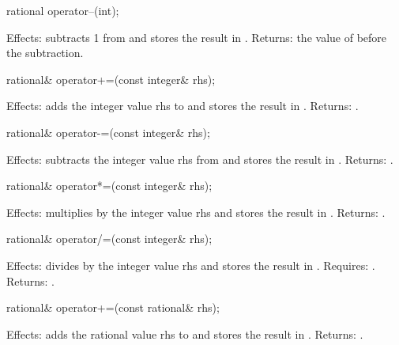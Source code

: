 \begin{itemdecl}
rational operator--(int);
\end{itemdecl}

\begin{itemdescr}
Effects: subtracts 1 from  and stores the result in .
Returns: the value of  before the subtraction.
\end{itemdescr}

\begin{itemdecl}
rational& operator+=(const integer& rhs);
\end{itemdecl}

\begin{itemdescr}
Effects: adds the integer value rhs to  and stores the result in .
Returns: .
\end{itemdescr}

\begin{itemdecl}
rational& operator-=(const integer& rhs);
\end{itemdecl}

\begin{itemdescr}
Effects: subtracts the integer value rhs from  and stores the result in .
Returns: .
\end{itemdescr}

\begin{itemdecl}
rational& operator*=(const integer& rhs);
\end{itemdecl}

\begin{itemdescr}
Effects: multiplies  by the integer value rhs and stores the result in .
Returns: .
\end{itemdescr}

\begin{itemdecl}
rational& operator/=(const integer& rhs);
\end{itemdecl}

\begin{itemdescr}
Effects: divides  by the integer value rhs and stores the result in .
Requires: .
Returns: .
\end{itemdescr}

\begin{itemdecl}
rational& operator+=(const rational& rhs);
\end{itemdecl}

\begin{itemdescr}
Effects: adds the rational value rhs to  and stores the result in .
Returns: .
\end{itemdescr}

